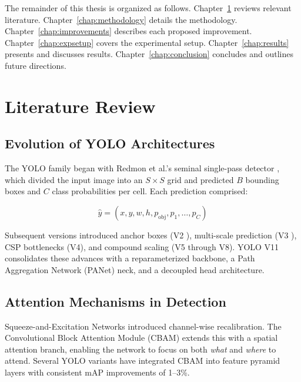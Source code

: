 \documentclass[12pt, a4paper]{report}
\begin{document}
The remainder of this thesis is organized as follows. Chapter~\ref{chap:litreview} 
reviews relevant literature. Chapter~\ref{chap:methodology} details the methodology. 
Chapter~\ref{chap:improvements} describes each proposed improvement. 
Chapter~\ref{chap:expsetup} covers the experimental setup. 
Chapter~\ref{chap:results} presents and discusses results. 
Chapter~\ref{chap:conclusion} concludes and outlines future directions.

\chapter{Literature Review}
\label{chap:litreview}

\section{Evolution of YOLO Architectures}

The YOLO family began with Redmon et al.'s seminal single-pass detector \cite{redmon2016yolo}, 
which divided the input image into an $S \times S$ grid and predicted $B$ bounding boxes 
and $C$ class probabilities per cell. Each prediction comprised:

\begin{equation}
  \hat{y} = (x, y, w, h, p_{\text{obj}}, p_1, \ldots, p_C)
  \label{eq:yolo-pred}
\end{equation}

Subsequent versions introduced anchor boxes (V2 \cite{redmon2017yolo9000}), 
multi-scale prediction (V3 \cite{redmon2018yolov3}), CSP bottlenecks (V4), 
and compound scaling (V5 through V8). YOLO V11 consolidates these advances with 
a reparameterized backbone, a Path Aggregation Network (PANet) neck, and a 
decoupled head architecture.

\section{Attention Mechanisms in Detection}

Squeeze-and-Excitation Networks \cite{hu2018senet} introduced channel-wise 
recalibration. The Convolutional Block Attention Module (CBAM) \cite{woo2018cbam} 
extends this with a spatial attention branch, enabling the network to focus on 
both \textit{what} and \textit{where} to attend. Several YOLO variants have 
integrated CBAM into feature pyramid layers with consistent mAP improvements 
of 1–3\%.
\end{document}
